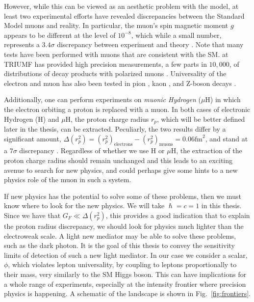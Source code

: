 However, while this can be viewed as an aesthetic problem with the model, at least two experimental efforts have revealed discrepancies between the Standard Model muons and reality.
In particular, the muon's spin magnetic moment $g$ appears to be different at the level of $10^{-8}$, which while a small number, represents a $3.4\sigma$ discrepancy between experiment and theory \cite{2007PhLB..649..173H}.
Note that many tests have been performed with muons that are consistent with the SM.
\twist at TRIUMF has provided high precision measurements, a few parts in $10,000$, of distributions of decay products with polarized muons \cite{Bayes:2011zza}.
Universality of the electron and muon has also been tested in pion \cite{Czapek:1993kc}, kaon \cite{Antonelli:2008jg}, and Z-boson decays \cite{Alexander:1991qw}.

Additionally, one can perform experiments on \emph{muonic Hydrogen} ($\mu\textrm{H}$) in which the electron orbiting a proton is replaced with a muon.
In both cases of electronic Hydrogen (H) and $\mu\textrm{H}$, the proton charge radius $r_p$, which will be better defined later in the thesis, can be extracted.
Peculiarly, the two results differ by a significant amount, $\Delta(r_p^2) = (r_p^2)_{\textrm{electrons}} - (r_p^2)_{\textrm{muons}} = 0.06\textrm{fm}^2$, and stand at a $7\sigma$ discrepancy \cite{Carlson:2015jba}.
Regardless of whether we use H or $\mu\textrm{H}$, the extraction of the proton charge radius should remain unchanged and this leads to an exciting avenue to search for new physics, and could perhaps give some hints to a new physics role of the muon in such a system.

If new physics has the potential to solve some of these problems, then we must know where to look for the new physics.
We will take $\hslash = c = 1$ in this thesis.
Since we have that $G_F \ll \Delta(r_p^2)$, this provides a good indication that to explain the proton radius discrepancy, we should look for physics much lighter than the electroweak scale.
A light new mediator may be able to solve these problems, such as the dark photon.
It is the goal of this thesis to convey the sensitivity limits of detection of such a new light mediator.
In our case we consider a scalar, $\phi$, which violates lepton universality, by coupling to leptons proportionally to their mass, very similarly to the SM Higgs boson.
This can have implications for a whole range of experiments, especially at the intensity frontier where precision physics is happening.
A schematic of the landscape is shown in Fig.\ \ref{fig:frontiers}.


